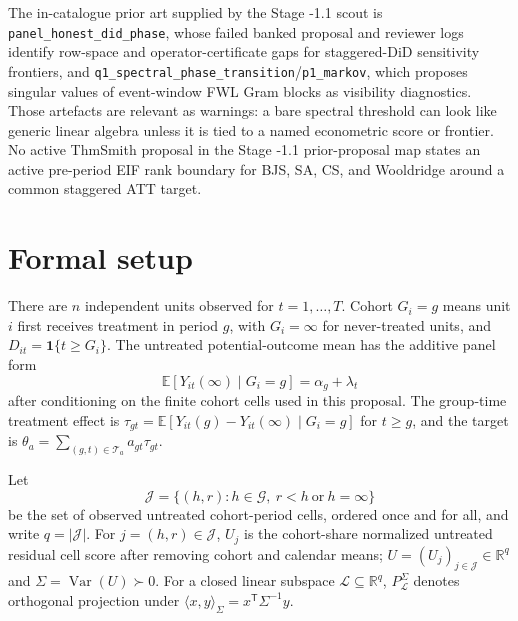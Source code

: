 \documentclass[11pt]{article}
\newcommand{\E}{\mathbb{E}}
\newcommand{\one}{\mathbf{1}}
\newcommand{\transpose}{\mathsf{T}}
\newcommand{\R}{\mathbb{R}}
\theoremstyle{definition}
\theoremstyle{plain}
\theoremstyle{remark}
\begin{document}
The in-catalogue prior art supplied by the Stage -1.1 scout is
\texttt{panel\_honest\_did\_phase}, whose failed banked proposal and reviewer
logs identify row-space and operator-certificate gaps for staggered-DiD
sensitivity frontiers, and
\texttt{q1\_spectral\_phase\_transition}/\texttt{p1\_markov}, which proposes
singular values of event-window FWL Gram blocks as visibility diagnostics.
Those artefacts are relevant as warnings: a bare spectral threshold can look
like generic linear algebra unless it is tied to a named econometric score or
frontier.  No active ThmSmith proposal in the Stage -1.1 prior-proposal map
states an active pre-period EIF rank boundary for BJS, SA, CS, and Wooldridge
around a common staggered ATT target.

\section{Formal setup}
There are \(n\) independent units observed for \(t=1,\ldots,T\).  Cohort
\(G_i=g\) means unit \(i\) first receives treatment in period \(g\), with
\(G_i=\infty\) for never-treated units, and \(D_{it}=\one\{t\ge G_i\}\).  The
untreated potential-outcome mean has the additive panel form
\[
  \E[Y_{it}(\infty)\mid G_i=g]=\alpha_g+\lambda_t
\]
after conditioning on the finite cohort cells used in this proposal.  The
group-time treatment effect is
\(\tau_{gt}=\E[Y_{it}(g)-Y_{it}(\infty)\mid G_i=g]\) for \(t\ge g\), and the
target is \(\theta_a=\sum_{(g,t)\in\mathcal T_a}a_{gt}\tau_{gt}\).

Let
\[
  \mathcal J=\{(h,r): h\in\mathcal G,\ r<h\ \text{or}\ h=\infty\}
\]
be the set of observed untreated cohort-period cells, ordered once and for all,
and write \(q=|\mathcal J|\).  For \(j=(h,r)\in\mathcal J\), \(U_j\) is the
cohort-share normalized untreated residual cell score after removing cohort
and calendar means; \(U=(U_j)_{j\in\mathcal J}\in\R^q\) and
\(\Sigma=\operatorname{Var}(U)\succ0\).  For a closed linear subspace
\(\mathcal L\subseteq\R^q\), \(P_{\mathcal L}^{\Sigma}\) denotes orthogonal
projection under
\(\langle x,y\rangle_{\Sigma}=x^{\transpose}\Sigma^{-1}y\).
\end{document}
